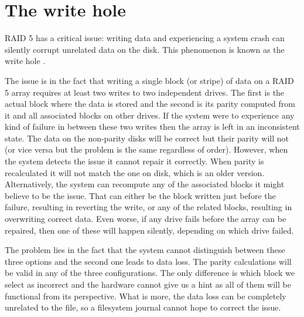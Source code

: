     \section{The write hole}
        \label{sec:RAID_problems}

        RAID 5 has a critical issue: writing data and experiencing a system
        crash can silently corrupt unrelated data on the disk. This phenomenon
        is known as the write hole \cite{LWN_md_journal}.

        The issue is in the fact that writing a single block (or stripe) of
        data on a RAID 5 array requires at least two writes to two independent
        drives. The first is the actual block where the data is stored and the
        second is its parity computed from it and all associated blocks on other
        drives. If the system were to experience any kind of failure in between
        these two writes then the array is left in an inconsistent state. The
        data on the non-parity disks will be correct but their parity will not
        (or vice versa but the problem is the same regardless of order).
        However, when the system detects the issue it cannot repair it
        correctly. When parity is recalculated it will not match the one on
        disk, which is an older version. Alternatively, the system can
        recompute any of the associated blocks it might believe to be the
        issue. That can either be the block written just before the failure,
        resulting in reverting the write, or any of the related blocks,
        resulting in overwriting correct data. Even worse, if any drive fails
        before the array can be repaired, then one of these will happen
        silently, depending on which drive failed.

        The problem lies in the fact that the system cannot distinguish between
        these three options and the second one leads to data loss. The parity
        calculations will be valid in any of the three configurations. The only
        difference is which block we select as incorrect and the hardware
        cannot give us a hint as all of them will be functional from its
        perspective. What is more, the data loss can be completely unrelated to
        the file, so a filesystem journal cannot hope to correct the issue.


